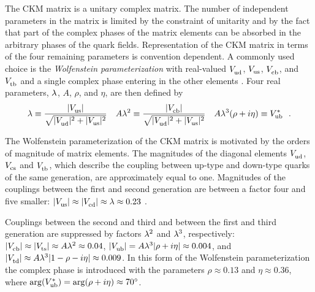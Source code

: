 The CKM matrix is a unitary complex matrix. The number of independent parameters in the matrix is limited by the constraint of unitarity
and by the fact that part of the complex phases of the matrix elements can be absorbed in the arbitrary phases of the quark fields.
Representation of the CKM matrix in terms of the four remaining parameters is convention dependent. A commonly used choice is the
\emph{Wolfenstein parameterization} with real-valued $\Vud$, $\Vus$, $\Vcb$, and $\Vtb$ and a single complex phase entering in the other
elements \cite{Wolfenstein:1983yz,*Chau:1984fp,*Buras:1994ec}. Four real parameters, $\lam$, $A$, $\rho$, and $\eta$, are then
defined by
\begin{equation}
  \begin{gathered}
    \lam \equiv \frac{|\Vus|}{\sqrt{|\Vud|^2 + |\Vus|^2}}
      \quad
      A\lam^2 \equiv \frac{|\Vcb|}{\sqrt{|\Vud|^2 + |\Vus|^2}}
      \quad
      A\lam^3(\rho+i\eta) \equiv \Vub[*]
      \ \ .
  \end{gathered}
\end{equation}

The Wolfenstein parameterization of the CKM matrix is motivated by the orders of magnitude of matrix elements. The magnitudes of the
diagonal elements $\Vud$, $\Vcs$ and $\Vtb$, which describe the coupling between up-type and down-type quarks of the same generation, are
approximately equal to one. Magnitudes of the couplings between the first and second generation are between a factor four and five smaller:
$|\Vus|\approx|\Vcd|\approx\lam\approx0.23$ \cite{Charles:2004jd,Bona:2005vz}.

Couplings between the second and third and between the first and third generation are suppressed by factors $\lam^2$ and $\lam^3$,
respectively: $|\Vcb|\approx|\Vts|\approx A\lam^2\approx0.04$, $|\Vub|=A\lam^3|\rho+i\eta|\approx0.004$, and $|\Vtd|\approx
A\lam^3|1-\rho-i\eta|\approx0.009$. In this form of the Wolfenstein parameterization the complex phase is introduced with the parameters
$\rho\approx0.13$ and $\eta\approx0.36$, where $\arg(\Vub[*])=\arg(\rho+i\eta)\approx70^\circ$.

